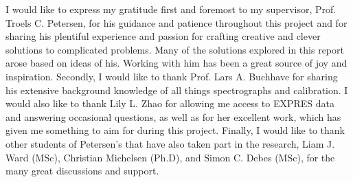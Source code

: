 I would like to express my gratitude first and foremost to my supervisor, Prof. Troels C. Petersen, for his guidance and patience throughout this project and for sharing his plentiful experience and passion for crafting creative and clever solutions to complicated problems. Many of the solutions explored in this report arose based on ideas of his. Working with him has been a great source of joy and inspiration. Secondly, I would like to thank Prof. Lars A. Buchhave for sharing his extensive background knowledge of all things spectrographs and calibration. I would also like to thank Lily L. Zhao for allowing me access to EXPRES data and answering occasional questions, as well as for her excellent work, which has given me something to aim for during this project. Finally, I would like to thank other students of Petersen's that have also taken part in the research, Liam J. Ward (MSc), Christian Michelsen (Ph.D), and Simon C. Debes (MSc), for the many great discussions and support. 



